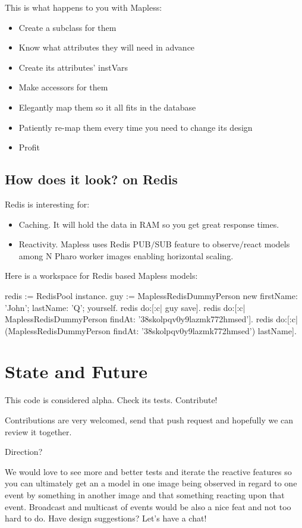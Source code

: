 \documentclass[a4paper,10pt,twoside]{book}
\begin{document}
This is what happens to you with Mapless:

\begin{itemize}
\item Create a subclass for them
\item Know what attributes they will need in advance
\item Create its attributes' instVars
\item Make accessors for them
\item Elegantly map them so it all fits in the database
\item Patiently re-map them every time you need to change its design
\item Profit
\end{itemize}
\subsection{ How does it look? on Redis}
Redis is interesting for:

\begin{itemize}
\item Caching. It will hold the data in RAM so you get great response times.
\item Reactivity. Mapless uses Redis PUB$/$SUB feature to observe$/$react models among N Pharo worker images enabling horizontal scaling.
\end{itemize}

Here is a workspace for Redis based Mapless models:


\begin{code}{}
redis := RedisPool instance.
guy := MaplessRedisDummyPerson new
            firstName: 'John';
            lastName: 'Q';
            yourself.               
redis do:[:c| guy save].
redis do:[:c| MaplessRedisDummyPerson findAt: '38skolpqv0y9lazmk772hmsed'].
redis do:[:c| (MaplessRedisDummyPerson findAt: '38skolpqv0y9lazmk772hmsed') lastName].
\end{code}

\section{ State and Future }
This code is considered alpha. Check its tests. Contribute!

Contributions are very welcomed, send that push request and hopefully we can review it together.

Direction?

We would love to see more and better tests and iterate the reactive features so you can ultimately get an a model in one image being observed in regard to one event by something in another image and that something reacting upon that event. Broadcast and multicast of events would be also a nice feat and not too hard to do. Have design suggestions? Let's have a chat!
\end{document}
